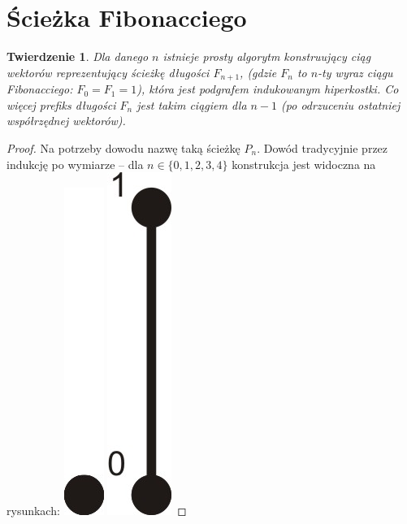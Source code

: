 \documentclass{pracamgr}
\newtheorem{theorem}{Twierdzenie}
\begin{document}
   \section{Ścieżka Fibonacciego}
    \begin{theorem}\label{co najmniej fibo}
     Dla danego $n$ istnieje prosty algorytm konstruujący ciąg wektorów reprezentujący ścieżkę długości $F_{n+1}$,
     (gdzie $F_n$ to $n$-ty wyraz ciągu Fibonacciego: $F_0=F_1=1$), która jest podgrafem indukowanym hiperkostki.
     Co więcej prefiks długości $F_{n}$ jest takim ciągiem dla $n-1$ (po odrzuceniu ostatniej współrzędnej wektorów).
    \end{theorem}
    \begin{proof}%
     Na potrzeby dowodu nazwę taką ścieżkę $P_n$.
     Dowód tradycyjnie przez indukcję po wymiarze -- dla $n\in\{0,1,2,3,4\}$ konstrukcja jest widoczna na rysunkach:\newline
     \hspace*{0pt}\includegraphics[scale=0.6]{img/Q0_long_path.jpg}
     \hspace*{12pt}\includegraphics[scale=0.6]{img/Q1_long_path.jpg}

\end{proof}
\end{document}
